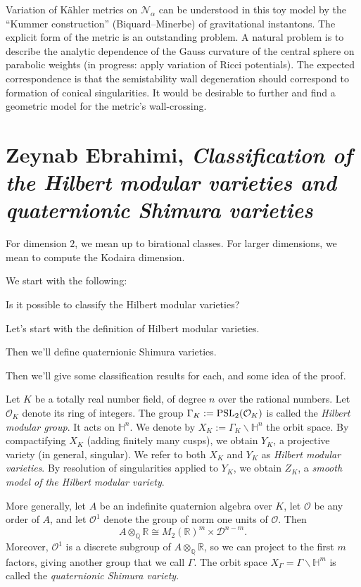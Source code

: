 \documentclass[reqno]{amsart} 
\numberwithin{theorem}{section}
\numberwithin{equation}{section}
\begin{document}
Variation of K\"{a}hler metrics on $\mathcal{N}_\alpha$ can be understood in this toy model by the ``Kummer construction'' (Biquard--Minerbe) of gravitational instantons.  The explicit form of the metric is an outstanding problem.  A natural problem is to describe the  analytic dependence of the Gauss curvature of the central sphere on parabolic weights (in progress: apply variation of Ricci potentials).  The expected correspondence is that the semistability wall degeneration should correspond to formation of conical singularities.  It would be desirable to further and find a geometric model for the metric's wall-crossing.


\section{Zeynab Ebrahimi, \emph{Classification of the Hilbert modular varieties and quaternionic Shimura varieties}}

For dimension $2$, we mean up to birational classes.  For larger dimensions, we mean to compute the Kodaira dimension.

We start with the following:

\begin{question}
  Is it possible to classify the Hilbert modular varieties?
\end{question}

Let's start with the definition of Hilbert modular varieties.

Then we'll define quaternionic Shimura varieties.

Then we'll give some classification results for each, and some idea of the proof.

Let $K$ be a totally real number field, of degree $n$ over the rational numbers.  Let $\mathcal{O}_K$ denote its ring of integers.  The group  $\Gamma_K := \operatorname{PSL}_2(\mathcal{O}_K)$ is called the \emph{Hilbert modular group}.  It acts on $\mathbb{H}^n$.  We denote by $X_K := \Gamma_K \backslash \mathbb{H}^n$ the orbit space.  By compactifying $X_K$ (adding finitely many cusps), we obtain $Y_K$, a projective variety (in general, singular).  We refer to both $X_K$ and $Y_K$ as \emph{Hilbert modular varieties}.  By resolution of singularities applied to $Y_K$, we obtain $Z_K$, a \emph{smooth model of the Hilbert modular variety}.

More generally, let $A$ be an indefinite quaternion algebra over $K$, let $\mathcal{O}$ be any order of $A$, and let $\mathcal{O}^1$ denote the group of norm one units of $\mathcal{O}$.  Then
\begin{equation*}
  A \otimes_{\mathbb{Q}} \mathbb{R} \cong M_2(\mathbb{R})^m \times \mathcal{D}^{n - m}.
\end{equation*}
Moreover, $\mathcal{O}^1$ is a discrete subgroup of $A \otimes_{\mathbb{Q}} \mathbb{R}$, so we can project to the first $m$ factors, giving another group that we call $\Gamma$.  The orbit space $X_\Gamma = \Gamma \backslash \mathbb{H}^m$ is called the \emph{quaternionic Shimura variety}.
\end{document}
